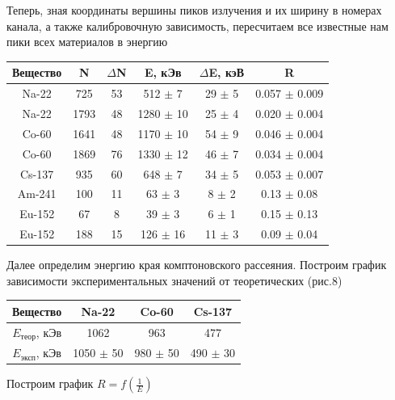 \documentclass[12pt,a4paper]{article}
\begin{document}
Теперь, зная координаты вершины пиков излучения и их ширину в номерах канала, а также калибровочную зависимость, пересчитаем все известные нам пики всех материалов в энергию

\begin{center}
\begin{tabular}{|c|c|c|c|c|c|}
\hline 
Вещество & N & $\Delta$N & E, кЭв & $\Delta$E, кэВ & R \\ 
\hline 
Na-22 & 725 & 53 & 512 $\pm$ 7 & 29 $\pm$ 5 & 0.057 $\pm$ 0.009 \\ 
\hline 
Na-22 & 1793 & 48 & 1280 $\pm$ 10 & 25 $\pm$ 4 & 0.020 $\pm$ 0.004 \\ 
\hline 
Co-60 & 1641 & 48 & 1170 $\pm$ 10 & 54 $\pm$ 9 & 0.046 $\pm$ 0.004 \\ 
\hline 
Co-60 & 1869 & 76 & 1330 $\pm$ 12 & 46 $\pm$ 7 & 0.034 $\pm$ 0.004 \\ 
\hline 
Cs-137 & 935 & 60 & 648 $\pm$ 7 & 34 $\pm$ 5 & 0.053 $\pm$ 0.007 \\ 
\hline 
Am-241 & 100 & 11 & 63 $\pm$ 3 & 8 $\pm$ 2 & 0.13 $\pm$ 0.08 \\ 
\hline 
Eu-152 & 67 & 8 & 39  $\pm$ 3 & 6 $\pm$ 1 & 0.15 $\pm$ 0.13 \\ 
\hline 
Eu-152 & 188 & 15 & 126 $\pm$ 16 & 11 $\pm$ 3 & 0.09 $\pm$ 0.04 \\ 
\hline 
\end{tabular} 
\end{center}

Далее определим энергию края комптоновского рассеяния. Построим график зависимости экспериментальных значений от теоретических (рис.8)

\begin{center}
\begin{tabular}{|c|c|c|c|}
\hline 
Вещество & Na-22 & Co-60 & Cs-137 \\ 
\hline 
$E_\text{теор}$, кЭв & 1062 & 963 & 477 \\ 
\hline 
$E_\text{эксп}$, кЭв & 1050 $\pm$ 50 & 980 $\pm$ 50 & 490 $\pm$ 30 \\ 
\hline 
\end{tabular} 
\end{center}

Построим график $R = f(\frac{1}{E})$
\end{document}
